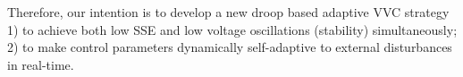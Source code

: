 \documentclass[journal]{IEEEtran}
\begin{document}
Therefore, our intention is to develop a new droop based adaptive VVC strategy 1) to achieve both low SSE and low voltage oscillations (stability) simultaneously; 2) to make control parameters dynamically self-adaptive to external disturbances in real-time.


\end{document}
